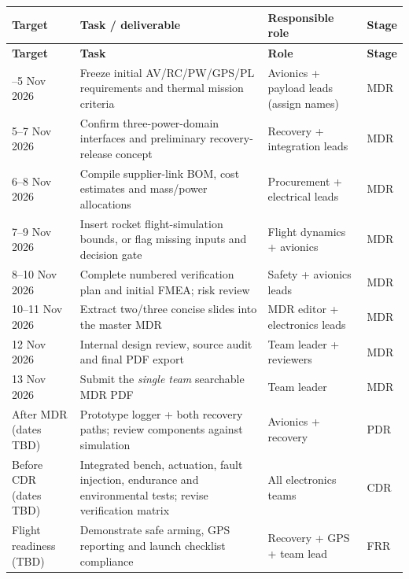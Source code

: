 \small
{}
\begin{longtable}{@{}L{27mm}L{63mm}L{38mm}L{23mm}@{}}
\toprule{}\textbf{Target}&\textbf{Task / deliverable}&\textbf{Responsible role}&\textbf{Stage}\\\midrule\endfirsthead
\toprule{}\textbf{Target}&\textbf{Task}&\textbf{Role}&\textbf{Stage}\\\midrule\endhead
\bottomrule{}--5 Nov 2026 & Freeze initial AV/RC/PW/GPS/PL requirements and thermal mission criteria & Avionics + payload leads (assign names) & MDR\\
5--7 Nov 2026 & Confirm three-power-domain interfaces and preliminary recovery-release concept & Recovery + integration leads & MDR\\
6--8 Nov 2026 & Compile supplier-link BOM, cost estimates and mass/power allocations & Procurement + electrical leads & MDR\\
7--9 Nov 2026 & Insert rocket flight-simulation bounds, or flag missing inputs and decision gate & Flight dynamics + avionics & MDR\\
8--10 Nov 2026 & Complete numbered verification plan and initial FMEA; risk review & Safety + avionics leads & MDR\\
10--11 Nov 2026 & Extract two/three concise slides into the master MDR & MDR editor + electronics leads & MDR\\
12 Nov 2026 & Internal design review, source audit and final PDF export & Team leader + reviewers & MDR\\
13 Nov 2026 & Submit the \emph{single team} searchable MDR PDF & Team leader & MDR\\
After MDR (dates TBD) & Prototype logger + both recovery paths; review components against simulation & Avionics + recovery & PDR\\
Before CDR (dates TBD) & Integrated bench, actuation, fault injection, endurance and environmental tests; revise verification matrix & All electronics teams & CDR\\
Flight readiness (TBD) & Demonstrate safe arming, GPS reporting and launch checklist compliance & Recovery + GPS + team lead & FRR\\
\end{longtable}
\normalsize

